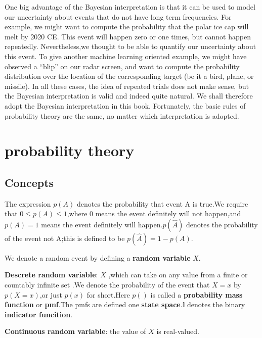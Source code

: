 One big advantage of the Bayesian interpretation is that it can be used to model our uncertainty about events that do not have long term frequencies. For example, we might want to compute the probability that the polar ice cap will melt by 2020 CE. This event will happen zero or one times, but cannot happen repeatedly. Nevertheless,we thought to be able to quantify our uncertainty about this event. To give another machine learning oriented example, we might have observed a “blip” on our radar screen, and want to compute the
probability distribution over the location of the corresponding target (be it a bird, plane, or missile). In all these cases, the idea of repeated trials does not make sense, but the Bayesian interpretation is valid and indeed quite natural. We shall therefore adopt the Bayesian interpretation in this book. Fortunately, the
basic rules of probability theory are the same, no matter which interpretation is adopted.


\section{probability theory}

\subsection{Concepts}
The expression $p(A)$ denotes the probability that event A is true.We require that $0\leq p(A) \leq 1$,where 0 means the event definitely will not happen,and $p(A)=1$ means the event definitely will happen.$p(\hat{A})$ denotes the probability of the event not A;this is defined to be $p(\hat{A})=1-p(A)$.

We denote a random event by defining a \textbf{random variable} $X$.

\textbf{Descrete random variable}: $X$ ,which can take on any value from a finite or countably infinite set .We denote the probability of the event that $X=x$ by $p(X=x)$,or just $p(x)$ for short.Here $p()$ is called a \textbf{probability mass function} or \textbf{pmf}.The pmfs are defined one \textbf{state space}.$\mathbb{I}$ denotes the binary \textbf{indicator funcition}.

\textbf{Continuous random variable}: the value of $X$ is real-valued.


